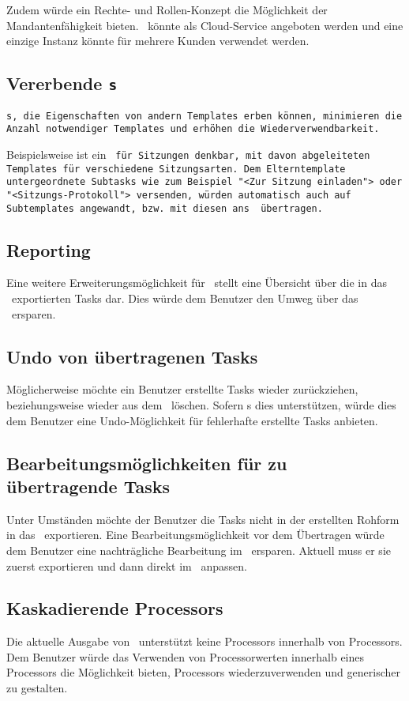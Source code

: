 			Zudem würde ein Rechte- und Rollen-Konzept die Möglichkeit der Mandantenfähigkeit bieten.
			\eeppi\ könnte als Cloud-Service angeboten werden und eine einzige Instanz könnte für mehrere Kunden verwendet werden.
			
		
		\subsection{Vererbende \tt s}
			\tt s, die Eigenschaften von andern Templates erben können, 
			minimieren die Anzahl notwendiger Templates und erhöhen die Wiederverwendbarkeit.
			
			Beispielsweise ist ein \tt\ für Sitzungen denkbar, mit
			davon abgeleiteten Templates für verschiedene Sitzungsarten.
			Dem Elterntemplate untergeordnete Subtasks wie zum Beispiel "<Zur Sitzung einladen"> oder "<Sitzungs-Protokoll"> versenden, würden automatisch auch auf Subtemplates angewandt, bzw. mit diesen ans \ppt\ übertragen.
			
		
		\subsection{Reporting}
			Eine weitere Erweiterungsmöglichkeit für \eeppi\ stellt eine Übersicht über die in das \ppt\ exportierten Tasks dar.
			Dies würde dem Benutzer den Umweg über das \ppt\ ersparen.
		
		
		\subsection{Undo von übertragenen Tasks}
			Möglicherweise möchte ein Benutzer erstellte Tasks wieder zurückziehen,
			beziehungsweise wieder aus dem \ppt\ löschen.
			Sofern \ppt s dies unterstützen, würde dies dem Benutzer eine Undo-Möglichkeit für fehlerhafte erstellte Tasks anbieten.
		
		
		\subsection{Bearbeitungsmöglichkeiten für zu übertragende Tasks}
			Unter Umständen möchte der Benutzer die Tasks nicht in der erstellten Rohform in das \ppt\ exportieren.
			Eine Bearbeitungsmöglichkeit vor dem Übertragen würde dem Benutzer eine nachträgliche Bearbeitung im \ppt\ ersparen.
			Aktuell muss er sie zuerst exportieren und dann direkt im \ppt\ anpassen.
			
			
		\subsection{Kaskadierende Processors}
			Die aktuelle Ausgabe von \eeppi\ unterstützt keine Processors innerhalb von Processors.
			Dem Benutzer würde das Verwenden von Processorwerten innerhalb eines Processors die Möglichkeit bieten, Processors wiederzuverwenden und generischer zu gestalten.
			
